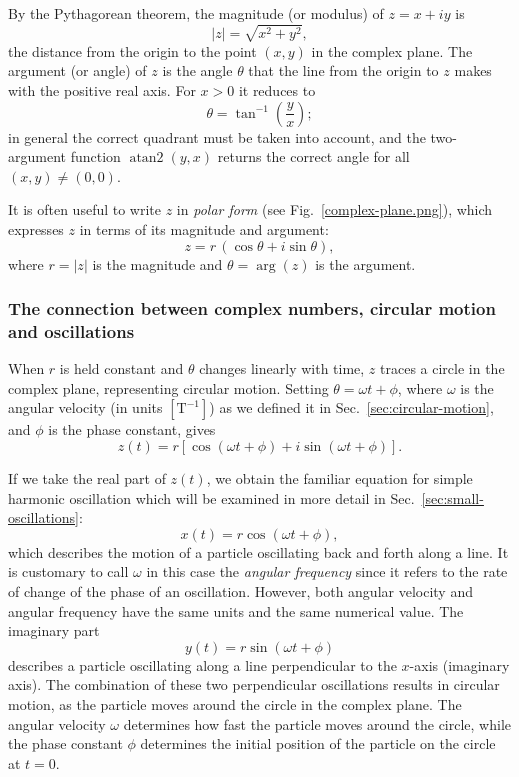\documentclass[12pt]{article}
\theoremstyle{remark}
\begin{document}
By the Pythagorean theorem, the magnitude (or modulus) of $z = x + iy$ is
\begin{equation}
    |z| = \sqrt{x^2 + y^2},
\end{equation}
the distance from the origin to the point $(x,y)$ in the complex plane. The argument
(or angle) of $z$ is the angle $\theta$ that the line from the origin to $z$ makes with
the positive real axis. For $x > 0$ it reduces to
\begin{equation}
    \theta = \tan^{-1}\!\left(\frac{y}{x}\right);
\end{equation}
in general the correct quadrant must be taken into account, and the two-argument function
$\operatorname{atan2}(y,x)$ returns the correct angle for all $(x,y)\neq(0,0)$.

It is often useful to write $z$ in \emph{polar form} (see Fig.~\ref{complex-plane.png}), which expresses $z$ in terms of its magnitude and argument:
\begin{equation}
    z = r\,(\cos\theta + i\sin\theta),
\end{equation}
where $r = |z|$ is the magnitude and $\theta = \arg(z)$ is the argument. 


\subsubsection*{The connection between complex numbers, circular motion and oscillations}

When $r$ is held constant and $\theta$ changes linearly with time, $z$ traces a circle in the complex plane, representing circular motion. Setting $\theta = \omega t + \phi$, where
$\omega$ is the angular velocity (in units $[\mathrm{T}^{-1}]$) as we defined it in Sec.~\ref{sec:circular-motion}, and $\phi$ is
the phase constant, gives
\begin{equation}
    z(t) = r\left[\cos(\omega t+\phi)+i\sin(\omega t+\phi)\right].
\end{equation}
                
If we take the real part of $z(t)$, we obtain the familiar equation for simple harmonic oscillation which will be examined in more detail in Sec.~\ref{sec:small-oscillations}:
\begin{equation}
    x(t) = r\cos(\omega t+\phi),
\end{equation}
which describes the motion of a particle oscillating back and forth along a line. It is customary to call $\omega$ in this case the \emph{angular frequency} since it refers to the rate of change of the phase of an oscillation. However, both angular velocity and angular frequency have the same units and the same numerical value. The imaginary part 
\begin{equation}
    y(t) = r\sin(\omega t+\phi)
\end{equation}
describes a particle oscillating along a line perpendicular to the $x$-axis (imaginary axis). The combination of these two perpendicular oscillations results in circular motion, as the particle moves around the circle in the complex plane. The angular velocity $\omega$ determines how fast the particle moves around the circle, while the phase constant $\phi$ determines the initial position of the particle on the circle at $t=0$.
\end{document}

